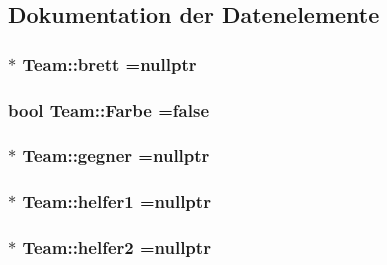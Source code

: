 \subsection{Dokumentation der Datenelemente}
\hypertarget{class_team_a11297253f6cd542d16cadda671e858fc}{}
\subsubsection[{brett}]{$\ast$ Team\+::brett =nullptr\hspace{0.3cm}{\ttfamily [private]}}\label{class_team_a11297253f6cd542d16cadda671e858fc}
\hypertarget{class_team_a8177ac0df0beef8c2489401000be6868}{}
\subsubsection[{Farbe}]{\setlength{\rightskip}{0pt plus 5cm}bool Team\+::\+Farbe =false\hspace{0.3cm}{\ttfamily [private]}}\label{class_team_a8177ac0df0beef8c2489401000be6868}
\hypertarget{class_team_ac5014169ca8a0a48b4d2aeac44e693dd}{}
\subsubsection[{gegner}]{$\ast$ Team\+::gegner =nullptr\hspace{0.3cm}{\ttfamily [private]}}\label{class_team_ac5014169ca8a0a48b4d2aeac44e693dd}
\hypertarget{class_team_a567566ff8b74878120070386105bb60d}{}
\subsubsection[{helfer1}]{$\ast$ Team\+::helfer1 =nullptr\hspace{0.3cm}{\ttfamily [private]}}\label{class_team_a567566ff8b74878120070386105bb60d}
\hypertarget{class_team_a9df764cfcf97e0ca9f386a91da041f1f}{}
\subsubsection[{helfer2}]{ $\ast$ Team\+::helfer2 =nullptr\hspace{0.3cm}{\ttfamily [private]}}\label{class_team_a9df764cfcf97e0ca9f386a91da041f1f}
\hypertarget{class_team_a5d3c196e4039c8e4666fcd0156f3129b}{}
